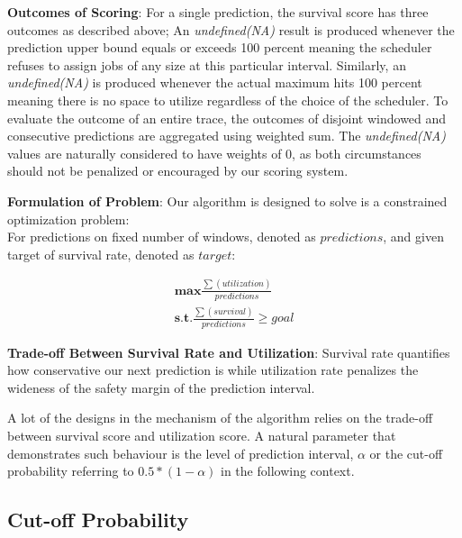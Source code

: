 \documentclass{article}
\begin{document}
\begin{flushleft}
\textbf{Outcomes of Scoring}: For a single prediction, the survival score has
three outcomes as described above; An \textit{undefined(NA)} result is produced
whenever the prediction upper bound equals or exceeds 100 percent meaning the
scheduler refuses to assign jobs of any size at this particular interval.
Similarly, an \textit{undefined(NA)} is produced whenever the actual maximum
hits 100 percent meaning there is no space to utilize regardless of the choice
of the scheduler. To evaluate the outcome of an entire trace, the outcomes of
disjoint windowed and consecutive predictions are aggregated using weighted sum.
The \textit{undefined(NA)} values are naturally considered to have weights of 0,
as both circumstances should not be penalized or encouraged by our scoring
system.
\end{flushleft}

\begin{flushleft}
\textbf{Formulation of Problem}: Our algorithm is designed to solve is a
constrained optimization problem: \\
For predictions on fixed number of windows, denoted as $predictions$, and given
target of survival rate, denoted as $target$:

\begin{equation*}\label{eq:pareto mle2}
  \begin{multlined}
    \mathbf{max}  \frac{\sum(utilization)}{predictions} \\
    \mathbf{s.t.} \frac{\sum(survival)}{predictions} \geq goal
 \end{multlined}
\end{equation*}
\end{flushleft}

\begin{flushleft}
\textbf{Trade-off Between Survival Rate and Utilization}: Survival rate
quantifies how conservative our next prediction is while utilization rate
penalizes the wideness of the safety margin of the prediction interval.

A lot of the designs in the mechanism of the algorithm relies on the trade-off
between survival score and utilization score. A natural parameter that
demonstrates such behaviour is the level of prediction interval, $\alpha$ or the
cut-off probability referring to $0.5 * (1 - \alpha)$ in the following context.
\end{flushleft}

\subsection{Cut-off Probability}
\end{document}
